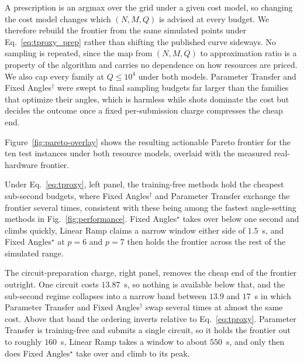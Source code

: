 A prescription is an argmax over the grid under a given cost model, so changing
the cost model changes which $(N, M, Q)$ is advised at every budget.
We therefore rebuild the frontier from the same simulated points under
Eq.~\eqref{eq:tproxy_prep} rather than shifting the published curve sideways.
No sampling is repeated, since the map from $(N, M, Q)$ to approximation ratio
is a property of the algorithm and carries no dependence on how resources are
priced.
We also cap every family at $Q \le 10^4$ under both models.
Parameter Transfer and Fixed Angles$^\dagger$ were swept to final sampling
budgets far larger than the families that optimize their angles, which is
harmless while shots dominate the cost but decides the outcome once a fixed
per-submission charge compresses the cheap end.



Figure~\ref{fig:pareto-overlay} shows the resulting actionable Pareto frontier
for the ten test instances under both resource models, overlaid with the
measured real-hardware frontier.

Under Eq.~\eqref{eq:tproxy}, left panel, the training-free methods hold the
cheapest sub-second budgets, where Fixed Angles$^\dagger$ and Parameter Transfer
exchange the frontier several times, consistent with these being among the
fastest angle-setting methods in Fig.~\ref{fig:performance}.
Fixed Angles$^\star$ takes over below one second and climbs quickly, Linear Ramp
claims a narrow window either side of $1.5$~s, and Fixed Angles$^\star$ at
$p = 6$ and $p = 7$ then holds the frontier across the rest of the simulated
range.

The circuit-preparation charge, right panel, removes the cheap end of the
frontier outright.
One circuit costs $13.87$~s, so nothing is available below that, and the
sub-second regime collapses into a narrow band between $13.9$ and $17$~s in
which Parameter Transfer and Fixed Angles$^\dagger$ swap several times at almost
the same cost.
Above that band the ordering inverts relative to Eq.~\eqref{eq:tproxy}.
Parameter Transfer is training-free and submits a single circuit, so it holds
the frontier out to roughly $160$~s, Linear Ramp takes a window to about
$550$~s, and only then does Fixed Angles$^\star$ take over and climb to its
peak.


